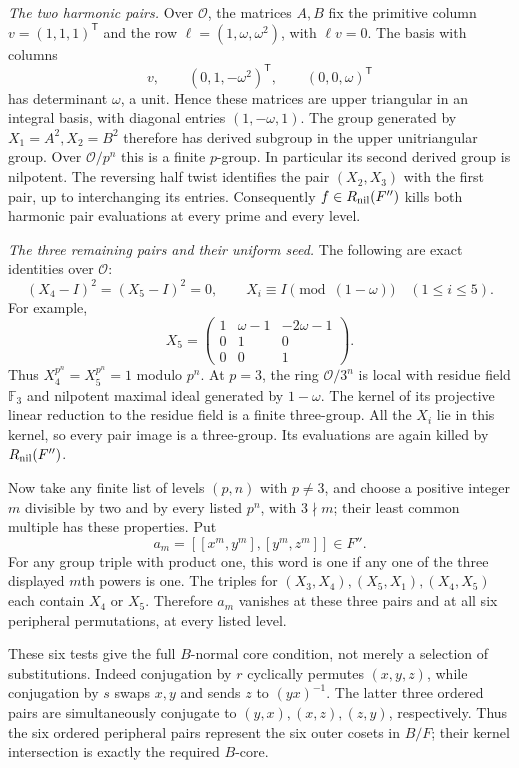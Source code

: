 \emph{The two harmonic pairs.}
Over $\mathcal O$, the matrices $A,B$ fix the primitive
column $v=(1,1,1)^{\mathsf T}$ and the row
$\ell=(1,\omega,\omega^2)$, with $\ell v=0$.
The basis with columns
\[
 v,\qquad(0,1,-\omega^2)^{\mathsf T},\qquad
                    (0,0,\omega)^{\mathsf T}
\]
has determinant $\omega$, a unit. Hence these matrices are
upper triangular in an integral basis, with diagonal entries
$(1,-\omega,1)$. The group generated by $X_1=A^2,X_2=B^2$
therefore has derived subgroup in the upper unitriangular
group. Over $\mathcal O/p^n$ this is a finite $p$-group.
In particular its second derived group is nilpotent.
The reversing half twist identifies the pair $(X_2,X_3)$
with the first pair, up to interchanging its entries.
Consequently $f\in R_{\rm nil}(F'')$ kills both harmonic
pair evaluations at every prime and every level.

\emph{The three remaining pairs and their uniform seed.}
The following are exact identities over $\mathcal O$:
\[
 (X_4-I)^2=(X_5-I)^2=0,
 \qquad X_i\equiv I\pmod{(1-\omega)}\quad(1\leq i\leq5).
\]
For example,
\[
 X_5=\begin{pmatrix}
 1&\omega-1&-2\omega-1\\0&1&0\\0&0&1
 \end{pmatrix}.
\]
Thus $X_4^{p^n}=X_5^{p^n}=1$ modulo $p^n$.
At $p=3$, the ring $\mathcal O/3^n$ is local with residue
field $\mathbb F_3$ and nilpotent maximal ideal generated
by $1-\omega$. The kernel of its projective linear
reduction to the residue field is a finite three-group.
All the $X_i$ lie in this kernel, so every pair image is a
three-group. Its evaluations are again killed by
$R_{\rm nil}(F'')$.

Now take any finite list of levels $(p,n)$ with $p\ne3$,
and choose a positive integer $m$ divisible by two and by
every listed $p^n$, with $3\nmid m$; their least common
multiple has these properties. Put
\[
             a_m=[[x^m,y^m],[y^m,z^m]]\in F''.
\]
For any group triple with product one, this word is one
if any one of the three displayed $m$th powers is one.
The triples for $(X_3,X_4),(X_5,X_1),(X_4,X_5)$ each
contain $X_4$ or $X_5$. Therefore $a_m$ vanishes at these
three pairs and at all six peripheral permutations, at
every listed level.

These six tests give the full $B$-normal core condition,
not merely a selection of substitutions. Indeed conjugation
by $r$ cyclically permutes $(x,y,z)$, while conjugation
by $s$ swaps $x,y$ and sends $z$ to $(yx)^{-1}$.
The latter three ordered pairs are simultaneously conjugate
to $(y,x),(x,z),(z,y)$, respectively. Thus the six ordered
peripheral pairs represent the six outer cosets in $B/F$;
their kernel intersection is exactly the required $B$-core.

